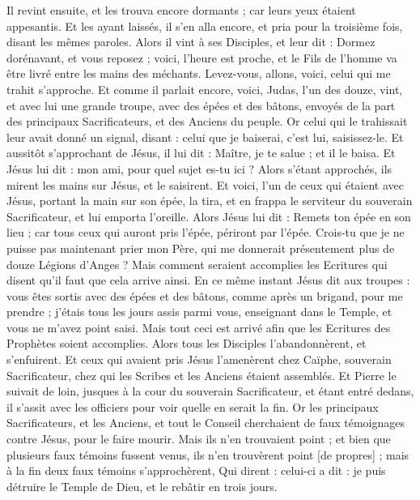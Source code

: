 \begin{multicols}{2}
Il revint ensuite, et les trouva encore dormants ; car leurs yeux étaient appesantis.
Et les ayant laissés, il s'en alla encore, et pria pour la troisième fois, disant les mêmes paroles.
Alors il vint à ses Disciples, et leur dit : Dormez dorénavant, et vous reposez ; voici, l'heure est proche, et le Fils de l'homme va être livré entre les mains des méchants.
Levez-vous, allons, voici, celui qui me trahit s'approche.
Et comme il parlait encore, voici, Judas, l'un des douze, vint, et avec lui une grande troupe, avec des épées et des bâtons, envoyés de la part des principaux Sacrificateurs, et des Anciens du peuple.
Or celui qui le trahissait leur avait donné un signal, disant : celui que je baiserai, c'est lui, saisissez-le.
Et aussitôt s'approchant de Jésus, il lui dit : Maître, je te salue ; et il le baisa.
Et Jésus lui dit : mon ami, pour quel sujet es-tu ici ? Alors s'étant approchés, ils mirent les mains sur Jésus, et le saisirent.
Et voici, l'un de ceux qui étaient avec Jésus, portant la main sur son épée, la tira, et en frappa le serviteur du souverain Sacrificateur, et lui emporta l'oreille.
Alors Jésus lui dit : Remets ton épée en son lieu ; car tous ceux qui auront pris l'épée, périront par l'épée.
Crois-tu que je ne puisse pas maintenant prier mon Père, qui me donnerait présentement plus de douze Légions d'Anges ?
Mais comment seraient accomplies les Ecritures qui disent qu'il faut que cela arrive ainsi.
En ce même instant Jésus dit aux troupes : vous êtes sortis avec des épées et des bâtons, comme après un brigand, pour me prendre ; j'étais tous les jours assis parmi vous, enseignant dans le Temple, et vous ne m'avez point saisi.
Mais tout ceci est arrivé afin que les Ecritures des Prophètes soient accomplies. Alors tous les Disciples l'abandonnèrent, et s'enfuirent.
Et ceux qui avaient pris Jésus l'amenèrent chez Caïphe, souverain Sacrificateur, chez qui les Scribes et les Anciens étaient assemblés.
Et Pierre le suivait de loin, jusques à la cour du souverain Sacrificateur, et étant entré dedans, il s'assit avec les officiers pour voir quelle en serait la fin.
Or les principaux Sacrificateurs, et les Anciens, et tout le Conseil cherchaient de faux témoignages contre Jésus, pour le faire mourir.
Mais ils n'en trouvaient point ; et bien que plusieurs faux témoins fussent venus, ils n'en trouvèrent point [de propres] ; mais à la fin deux faux témoins s'approchèrent,
Qui dirent : celui-ci a dit : je puis détruire le Temple de Dieu, et le rebâtir en trois jours.

\end{multicols}
